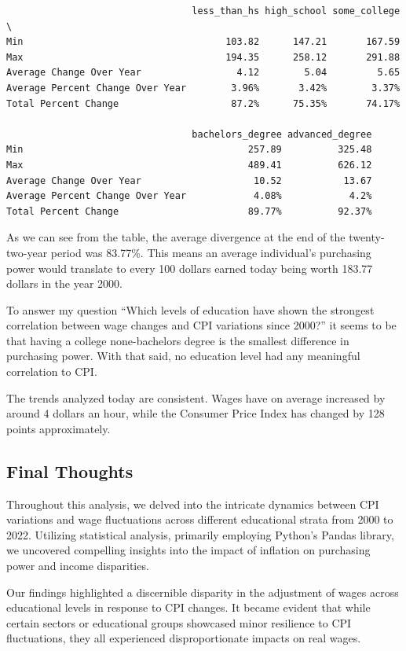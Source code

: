 \documentclass[
  letterpaper,
  DIV=11,
  numbers=noendperiod]{scrartcl}
\begin{document}
\begin{verbatim}
                                 less_than_hs high_school some_college  \
Min                                    103.82      147.21       167.59   
Max                                    194.35      258.12       291.88   
Average Change Over Year                 4.12        5.04         5.65   
Average Percent Change Over Year        3.96%       3.42%        3.37%   
Total Percent Change                    87.2%      75.35%       74.17%   

                                 bachelors_degree advanced_degree  
Min                                        257.89          325.48  
Max                                        489.41          626.12  
Average Change Over Year                    10.52           13.67  
Average Percent Change Over Year            4.08%            4.2%  
Total Percent Change                       89.77%          92.37%  
\end{verbatim}

As we can see from the table, the average divergence at the end of the
twenty-two-year period was 83.77\%. This means an average individual's
purchasing power would translate to every 100 dollars earned today being
worth 183.77 dollars in the year 2000.

To answer my question ``Which levels of education have shown the
strongest correlation between wage changes and CPI variations since
2000?'' it seems to be that having a college none-bachelors degree is
the smallest difference in purchasing power. With that said, no
education level had any meaningful correlation to CPI.

The trends analyzed today are consistent. Wages have on average
increased by around 4 dollars an hour, while the Consumer Price Index
has changed by 128 points approximately.

\hypertarget{final-thoughts}{%
\subsection{Final Thoughts}\label{final-thoughts}}

Throughout this analysis, we delved into the intricate dynamics between
CPI variations and wage fluctuations across different educational strata
from 2000 to 2022. Utilizing statistical analysis, primarily employing
Python's Pandas library, we uncovered compelling insights into the
impact of inflation on purchasing power and income disparities.

Our findings highlighted a discernible disparity in the adjustment of
wages across educational levels in response to CPI changes. It became
evident that while certain sectors or educational groups showcased minor
resilience to CPI fluctuations, they all experienced disproportionate
impacts on real wages.
\end{document}
